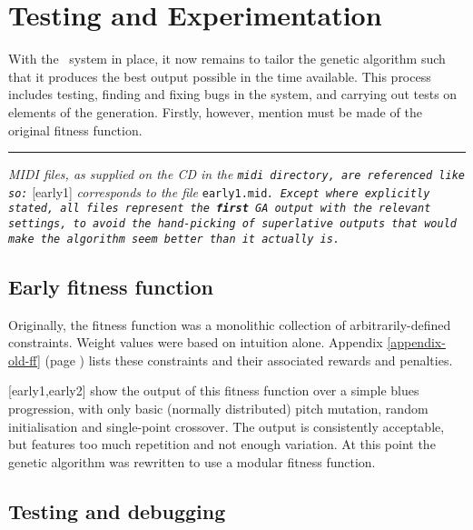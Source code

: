 \chapter{Testing and Experimentation}
\label{chap-testexp}


With the \jg\ system in place, it now remains to tailor the genetic algorithm such that it produces
the best output possible in the time available. This process includes testing, finding and fixing
bugs in the system, and carrying out tests on elements of the generation. Firstly, however, mention
must be made of the original fitness function. \begin{center}\rule[0.1cm]{0.6\textwidth}{0.5pt}\end{center}

\emph{MIDI files, as supplied on the CD in the \tt{midi} directory, are referenced like so:} [early1] \emph{corresponds to
the file} \tt{early1.mid}\emph{. Except where explicitly stated, all files represent the \textbf{first}
GA output with the relevant settings, to avoid the hand-picking of superlative outputs that would make the
algorithm seem better than it actually is.}

\section{Early fitness function}
\label{sec-earlyff}

Originally, the fitness function was a monolithic collection of arbitrarily-defined constraints. Weight values were based on intuition alone. Appendix \ref{appendix-old-ff} (page \pageref{appendix-old-ff}) lists these constraints and their associated rewards and penalties.

[early1,early2] show the output of this fitness function over a simple blues progression,
with only basic (normally distributed) pitch mutation, random initialisation and single-point crossover.
The output is consistently acceptable, but features too much repetition and not enough variation. At
this point the genetic algorithm was rewritten to use a modular fitness function.

\section{Testing and debugging}

